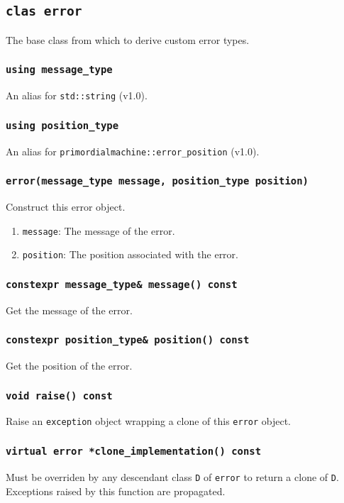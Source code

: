\documentclass[oneside]{article}
\begin{document}
\subsection{\texttt{clas error}}
The base class from which to derive custom error types.

\subsubsection{\texttt{using message\_type}}
An alias for \texttt{std::string} (v1.0).

\subsubsection{\texttt{using position\_type}}
An alias for \texttt{primordialmachine::error\_position} (v1.0).

\subsubsection{\texttt{error(message\_type message, position\_type position)}}
Construct this error object.
\begin{enumerate}
	\item\texttt{message}: The message of the error.
	\item\texttt{position}: The position associated with the error.
\end{enumerate}

\subsubsection{\texttt{constexpr message\_type\& message() const}}
Get the message of the error.

\subsubsection{\texttt{constexpr position\_type\& position() const}}
Get the position of the error.

\subsubsection{\texttt{void raise() const}}
Raise an \texttt{exception} object wrapping a clone of this \texttt{error} object.

\subsubsection{\texttt{virtual error *clone\_implementation() const}}
Must be overriden by any descendant class \texttt{D} of \texttt{error} to return a clone of
\texttt{D}. Exceptions raised by this function are propagated.
\end{document}
